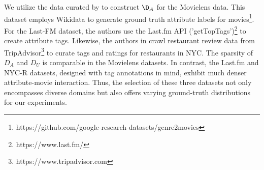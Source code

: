 We utilize the data curated by \citet{genere2movies} to construct $\D_A$ for the Movielens data. This dataset employs Wikidata \citep{vrandevcic2014wikidata} to generate ground truth attribute labels for movies\footnote{https://github.com/google-research-datasets/genre2movies}. For the Last-FM dataset, the authors use the Last.fm API ('getTopTags')\footnote{https://www.last.fm/} to create attribute tags. Likewise, the authors in \cite{nycr} crawl restaurant review data from TripAdvisor\footnote{https://www.tripadvisor.com} to curate tags and ratings for restaurants in NYC. The sparsity of $D_A$ and $D_U$ is comparable in the Movielens datasets. In contrast, the Last.fm and NYC-R datasets, designed with tag annotations in mind, exhibit much denser attribute-movie interaction. Thus, the selection of these three datasets not only encompasses diverse domains but also offers varying ground-truth distributions for our experiments.

